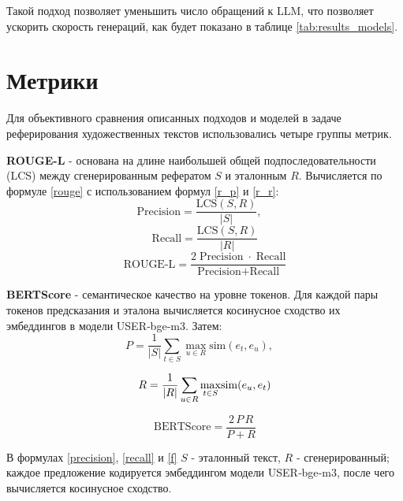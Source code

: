 \documentclass{superfri}
\begin{document}
Такой подход позволяет уменьшить число обращений к LLM, что позволяет ускорить скорость генераций, как будет показано в таблице \ref{tab:results_models}.


\section{Метрики}

Для объективного сравнения описанных подходов и моделей в задаче реферирования художественных текстов использовались четыре группы метрик.

\textbf{ROUGE-L} \cite{rouge} - основана на длине наибольшей общей подпоследовательности (LCS) между сгенерированным рефератом $S$ и эталонным $R$.
Вычисляется по формуле \eqref{rouge} с использованием формул \eqref{r_p} и \eqref{r_r}:
\begin{equation}\label{r_p}
  \text{Precision} = \frac{\mathrm{LCS}(S,R)}{|S|},\quad
\end{equation}
\begin{equation}\label{r_r}
  \text{Recall} = \frac{\mathrm{LCS}(S,R)}{|R|}
\end{equation}
\begin{equation}\label{rouge}
  \text{ROUGE‑L} = \frac{2\;\text{Precision}\;\cdot\;\text{Recall}}{\text{Precision} + \text{Recall}}
\end{equation}

\textbf{BERTScore} \cite{bertscore} - семантическое качество на уровне токенов. Для каждой пары токенов предсказания и эталона вычисляется косинусное сходство их эмбеддингов в модели USER‑bge‑m3. Затем:
\begin{equation}\label{precision}
P = \frac{1}{|S|}\sum_{t\in S}\max_{u\in R}\!\mathrm{sim}(e_t, e_u),\quad
\end{equation}

\begin{equation}\label{recall}
R = \frac{1}{|R|}\sum_{u\in R}\max_{t\in S}\!\mathrm{sim}(e_u, e_t)\\
\end{equation}

\begin{equation}\label{f}
\text{BERTScore} = \frac{2\,P\,R}{P+R}
\end{equation}

В формулах  \eqref{precision}, \eqref{recall} и \eqref{f} \(S\) - эталонный текст, \(R\) - сгенерированный; каждое предложение кодируется эмбеддингом модели USER‑bge‑m3, 
после чего вычисляется косинусное сходство.  
\end{document}

